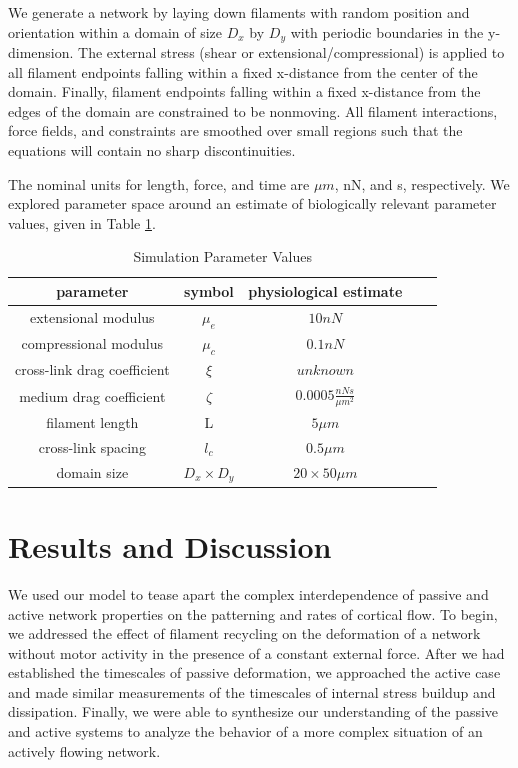 \documentclass[10pt,letterpaper]{article}
\begin{document}
We generate a network by laying down filaments with random position and orientation within a domain of size $D_x$ by $D_y$ with periodic boundaries in the y-dimension.  The external stress (shear or extensional/compressional) is applied to all filament endpoints falling within a fixed x-distance from the center of the domain.  Finally, filament endpoints falling within a fixed x-distance from the edges of the domain are constrained to be nonmoving.  All filament interactions, force fields, and constraints are smoothed over small regions such that the equations will contain no sharp discontinuities.


The nominal units for length, force, and time are $\mu m$, nN, and s, respectively.  We explored parameter space around an estimate of biologically relevant parameter values, given in Table \ref{table:para}. 

\begin{table}[h]
\centering
\caption{Simulation Parameter Values}
\label{table:para}
\begin{tabular}{|c|c|c|c|c|}
\hline
{\bf parameter}             & {\bf symbol} & {\bf physiological estimate}          \\ \hline
extensional modulus         & $\mu_e$        & $10 nN $                                               \\
compressional modulus             & $\mu_c$     & $ 0.1 nN $                           \\
cross-link drag coefficient & $\xi$      & $unknown $              \\
medium drag coefficient     & $\zeta$        & $0.0005 \frac{nN s}{\mu m^2} $      \\
filament length             & L            & $5 \mu m$                                          \\
cross-link spacing          & $l_c$        & $0.5 \mu m$                                         \\
domain size                 & $D_x\times D_y$            & $20\times 50 \mu m$                                 \\ \hline
\end{tabular}
\end{table}



\section*{Results and Discussion}
We used our model to tease apart the complex interdependence of passive and active network properties on the patterning and rates of cortical flow.  To begin, we addressed the effect of filament recycling on the deformation of a network without motor activity in the presence of a constant external force.  After we had established the timescales of passive deformation, we approached the active case and made similar measurements of the timescales of internal stress buildup and dissipation.  Finally, we were able to synthesize our understanding of the passive and active systems to analyze the behavior of a more complex situation of an actively flowing network.  
\end{document}
